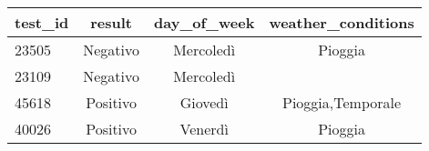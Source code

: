 \begin{itemize}
	\vspace{.5em}
	\begin{centering}
		\begin{tabular}{lccc}
			\toprule
			test\_id & result & day\_of\_week & weather\_conditions \\
			\midrule
			23505 & Negativo & Mercoledì & {Pioggia} \\
			23109 &	Negativo & Mercoledì & {} \\
			45618 &	Positivo & Giovedì & {Pioggia,Temporale} \\
			40026 &	Positivo & Venerdì & {Pioggia} \\
			\bottomrule
		\end{tabular}
		\label{tab:dataset-after-view}
	\end{centering}

\end{itemize}

